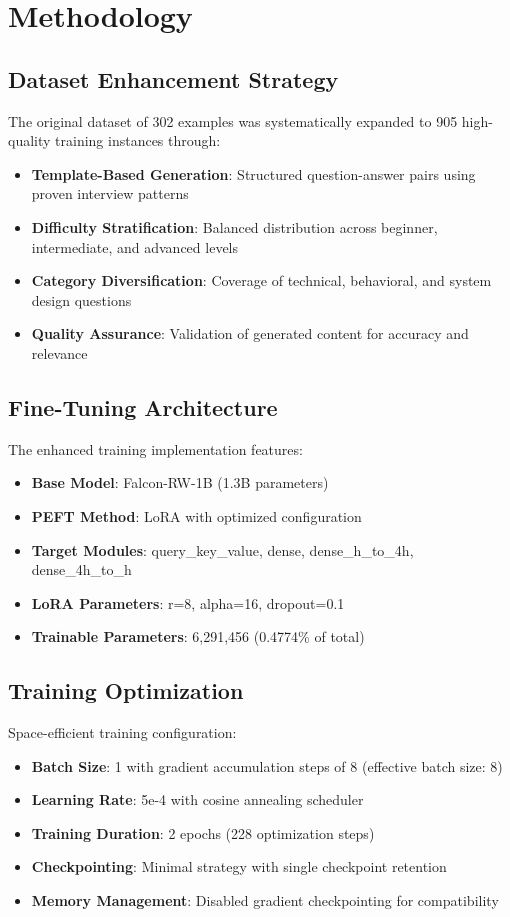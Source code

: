 \documentclass[12pt,a4paper]{article}
\begin{document}
\section{Methodology}

\subsection{Dataset Enhancement Strategy}
The original dataset of 302 examples was systematically expanded to 905 high-quality training instances through:

\begin{itemize}
    \item \textbf{Template-Based Generation}: Structured question-answer pairs using proven interview patterns
    \item \textbf{Difficulty Stratification}: Balanced distribution across beginner, intermediate, and advanced levels
    \item \textbf{Category Diversification}: Coverage of technical, behavioral, and system design questions
    \item \textbf{Quality Assurance}: Validation of generated content for accuracy and relevance
\end{itemize}

\subsection{Fine-Tuning Architecture}
The enhanced training implementation features:

\begin{itemize}
    \item \textbf{Base Model}: Falcon-RW-1B (1.3B parameters)
    \item \textbf{PEFT Method}: LoRA with optimized configuration
    \item \textbf{Target Modules}: query\_key\_value, dense, dense\_h\_to\_4h, dense\_4h\_to\_h
    \item \textbf{LoRA Parameters}: r=8, alpha=16, dropout=0.1
    \item \textbf{Trainable Parameters}: 6,291,456 (0.4774\% of total)
\end{itemize}

\subsection{Training Optimization}
Space-efficient training configuration:

\begin{itemize}
    \item \textbf{Batch Size}: 1 with gradient accumulation steps of 8 (effective batch size: 8)
    \item \textbf{Learning Rate}: 5e-4 with cosine annealing scheduler
    \item \textbf{Training Duration}: 2 epochs (228 optimization steps)
    \item \textbf{Checkpointing}: Minimal strategy with single checkpoint retention
    \item \textbf{Memory Management}: Disabled gradient checkpointing for compatibility
\end{itemize}
\end{document}
